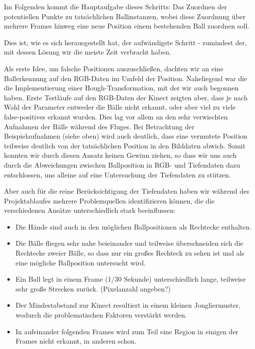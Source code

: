 \documentclass[12pt,a4paper,ngerman]{scrartcl}
\begin{document}
Im Folgenden kommt die Hauptaufgabe dieses Schritts: Das Zuordnen der potentiellen
Punkte zu tatsächlichen Ballinstanzen, wobei diese Zuordnung über mehrere Frames 
hinweg eine neue Position einem bestehenden Ball zuordnen soll.

Dies ist, wie es sich herausgestellt hat, der aufwändigste Schritt - zumindest der, mit dessen Lösung wir die meiste Zeit verbracht haben.

Als erste Idee, um falsche Positionen auszuschließen, dachten wir an eine 
Ballerkennung auf den RGB-Daten im Umfeld der Position. Naheliegend war die die 
Implementierung einer Hough-Transformation, mit der wir auch begonnen haben.
Erste Testläufe auf den RGB-Daten der Kinect zeigten aber, dass je nach Wahl der 
Parameter entweder die Bälle nicht erkannt, oder aber viel zu viele false-positives
erkannt wurden. Dies lag vor allem an den sehr verwischten Aufnahmen der Bälle 
während des Fluges. Bei Betrachtung der Beispielaufnahmen (siehe oben) wird auch 
deutlich, dass eine vermutete Position teilweise deutlich von der tatsächlichen
Position in den Bilddaten abwich. Somit konnten wir durch diesen Ansatz keinen Gewinn 
ziehen, so dass wir uns auch durch die Abweichungen zwischen Ballposition in RGB- und 
Tiefendaten dazu entschlossen, uns alleine auf eine Untersuchung der Tiefendaten zu 
stützen.

Aber auch für die reine Berücksichtigung der Tiefendaten haben wir während des 
Projektablaufes mehrere Problemquellen identifizieren können, die die verschiedenen 
Ansätze unterschiedlich stark beeinflussen:

\begin{itemize}
 \item Die Hände sind auch in den möglichen Ballpositionen als Rechtecke enthalten.
 \item Die Bälle fliegen sehr nahe beieinander und teilweise überschneiden sich die Rechtecke zweier Bälle, so dass nur ein großes Rechteck zu sehen ist und als eine mögliche Ballposition untersucht wird.
 \item Ein Ball legt in einem Frame (1/30 Sekunde) unterschiedlich lange, teilweise sehr große Strecken zurück. (Pixelanzahl angeben?)
 \item Der Mindestabstand zur Kinect resultiert in einem kleinen Jongliermuster, wodurch die problematischen Faktoren verstärkt werden.
 \item In aufeinander folgenden Frames wird zum Teil eine Region in einigen der Frames nicht erkannt, in anderen schon.
\end{itemize}
 
\end{document}
